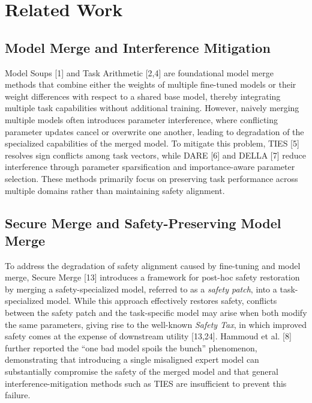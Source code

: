 \documentclass{article}
\begin{document}
    

\section{Related Work}

\subsection{Model Merge and Interference Mitigation}

Model Soups [1] and Task Arithmetic [2,4] are foundational model merge methods that combine either the weights of multiple fine-tuned models or their weight differences with respect to a shared base model, thereby integrating multiple task capabilities without additional training. However, naively merging multiple models often introduces parameter interference, where conflicting parameter updates cancel or overwrite one another, leading to degradation of the specialized capabilities of the merged model. To mitigate this problem, TIES [5] resolves sign conflicts among task vectors, while DARE [6] and DELLA [7] reduce interference through parameter sparsification and importance-aware parameter selection. These methods primarily focus on preserving task performance across multiple domains rather than maintaining safety alignment.

\subsection{Secure Merge and Safety-Preserving Model Merge}

To address the degradation of safety alignment caused by fine-tuning and model merge, Secure Merge [13] introduces a framework for post-hoc safety restoration by merging a safety-specialized model, referred to as a \emph{safety patch}, into a task-specialized model. While this approach effectively restores safety, conflicts between the safety patch and the task-specific model may arise when both modify the same parameters, giving rise to the well-known \emph{Safety Tax}, in which improved safety comes at the expense of downstream utility [13,24]. Hammoud et al. [8] further reported the ``one bad model spoils the bunch'' phenomenon, demonstrating that introducing a single misaligned expert model can substantially compromise the safety of the merged model and that general interference-mitigation methods such as TIES are insufficient to prevent this failure.
\end{document}
